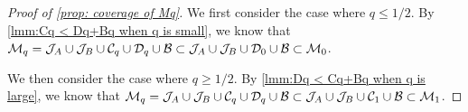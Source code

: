 \begin{proof}[Proof of \cref{prop: coverage of Mq}]
    We first consider the case where $q \leq 1/2$. 
    By \cref{lmm:Cq < Dq+Bq when q is small}, we know that $\mathcal{M}_{q}=\mathcal{J}_A \cup \mathcal{J}_B \cup \mathcal{C}_q \cup \mathcal{D}_{q}\cup \mathcal{B} \subset \mathcal{J}_A \cup \mathcal{J}_B \cup\mathcal{D}_0 \cup \mathcal{B} \subset \mathcal{M}_0$.

    We then consider the case where $q \geq 1/2$. 
    By \cref{lmm:Dq < Cq+Bq when q is large}, we know that $\mathcal{M}_{q}=\mathcal{J}_A \cup \mathcal{J}_B \cup\mathcal{C}_{q}\cup \mathcal{D}_{q} \cup \mathcal{B} \subset \mathcal{J}_A \cup \mathcal{J}_B \cup\mathcal{C}_1 \cup \mathcal{B} \subset \mathcal{M}_1$.
\end{proof}



